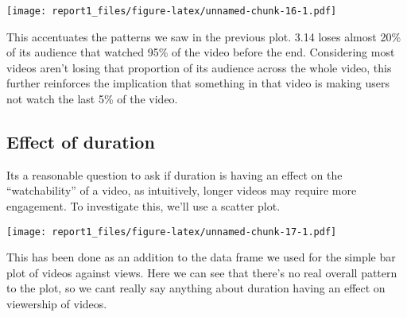 \documentclass[
]{article}
\newenvironment{Shaded}{\begin{snugshade}}{\end{snugshade}}
\newcommand{\CommentTok}[1]{\textcolor[rgb]{0.56,0.35,0.01}{\textit{#1}}}
\newcommand{\ControlFlowTok}[1]{\textcolor[rgb]{0.13,0.29,0.53}{\textbf{#1}}}
\newcommand{\DataTypeTok}[1]{\textcolor[rgb]{0.13,0.29,0.53}{#1}}
\newcommand{\DecValTok}[1]{\textcolor[rgb]{0.00,0.00,0.81}{#1}}
\newcommand{\KeywordTok}[1]{\textcolor[rgb]{0.13,0.29,0.53}{\textbf{#1}}}
\newcommand{\NormalTok}[1]{#1}
\newcommand{\OperatorTok}[1]{\textcolor[rgb]{0.81,0.36,0.00}{\textbf{#1}}}
\newcommand{\OtherTok}[1]{\textcolor[rgb]{0.56,0.35,0.01}{#1}}
\newcommand{\StringTok}[1]{\textcolor[rgb]{0.31,0.60,0.02}{#1}}
\begin{document}
\texttt{[image: report1\_files/figure-latex/unnamed-chunk-16-1.pdf]}

This accentuates the patterns we saw in the previous plot. 3.14 loses
almost 20\% of its audience that watched 95\% of the video before the
end. Considering most videos aren't losing that proportion of its
audience across the whole video, this further reinforces the implication
that something in that video is making users not watch the last 5\% of
the video.

\hypertarget{effect-of-duration}{%
\subsection{Effect of duration}\label{effect-of-duration}}

Its a reasonable question to ask if duration is having an effect on the
``watchability'' of a video, as intuitively, longer videos may require
more engagement. To investigate this, we'll use a scatter plot.

\begin{Shaded}
\end{Shaded}

\texttt{[image: report1\_files/figure-latex/unnamed-chunk-17-1.pdf]}

This has been done as an addition to the data frame we used for the
simple bar plot of videos against views. Here we can see that there's no
real overall pattern to the plot, so we cant really say anything about
duration having an effect on viewership of videos.
\end{document}
